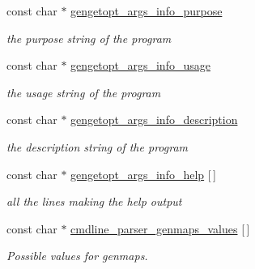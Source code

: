 \begin{DoxyCompactItemize}
\item 
\hypertarget{cuda-sakgengetopt_8h_a610c3307abce5a8fd304b86b018ae60b}{const char $\ast$ \hyperlink{cuda-sakgengetopt_8h_a610c3307abce5a8fd304b86b018ae60b}{gengetopt\-\_\-args\-\_\-info\-\_\-purpose}}\label{cuda-sakgengetopt_8h_a610c3307abce5a8fd304b86b018ae60b}

\begin{DoxyCompactList}\small\item\em the purpose string of the program \end{DoxyCompactList}\item 
\hypertarget{cuda-sakgengetopt_8h_a9f397a306f363bfdebb611e86acf36d5}{const char $\ast$ \hyperlink{cuda-sakgengetopt_8h_a9f397a306f363bfdebb611e86acf36d5}{gengetopt\-\_\-args\-\_\-info\-\_\-usage}}\label{cuda-sakgengetopt_8h_a9f397a306f363bfdebb611e86acf36d5}

\begin{DoxyCompactList}\small\item\em the usage string of the program \end{DoxyCompactList}\item 
\hypertarget{cuda-sakgengetopt_8h_accad6107ca685f6eba555f6ce63d355d}{const char $\ast$ \hyperlink{cuda-sakgengetopt_8h_accad6107ca685f6eba555f6ce63d355d}{gengetopt\-\_\-args\-\_\-info\-\_\-description}}\label{cuda-sakgengetopt_8h_accad6107ca685f6eba555f6ce63d355d}

\begin{DoxyCompactList}\small\item\em the description string of the program \end{DoxyCompactList}\item 
\hypertarget{cuda-sakgengetopt_8h_a6af7a6b7fb37c0abaa916ee1cfa0a41f}{const char $\ast$ \hyperlink{cuda-sakgengetopt_8h_a6af7a6b7fb37c0abaa916ee1cfa0a41f}{gengetopt\-\_\-args\-\_\-info\-\_\-help} \mbox{[}$\,$\mbox{]}}\label{cuda-sakgengetopt_8h_a6af7a6b7fb37c0abaa916ee1cfa0a41f}

\begin{DoxyCompactList}\small\item\em all the lines making the help output \end{DoxyCompactList}\item 
\hypertarget{cuda-sakgengetopt_8h_a95a846d24e5972af06cda34d4962564c}{const char $\ast$ \hyperlink{cuda-sakgengetopt_8h_a95a846d24e5972af06cda34d4962564c}{cmdline\-\_\-parser\-\_\-genmaps\-\_\-values} \mbox{[}$\,$\mbox{]}}\label{cuda-sakgengetopt_8h_a95a846d24e5972af06cda34d4962564c}

\begin{DoxyCompactList}\small\item\em Possible values for genmaps. \end{DoxyCompactList}\end{DoxyCompactItemize}



